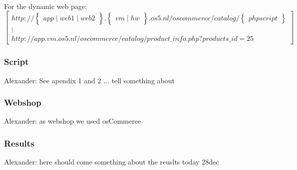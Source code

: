 \paragraph{}
For the dynamic web page:\\
$$ \begin{bmatrix}
http://  \begin{Bmatrix}app \mid web1 \mid web2 \end{Bmatrix} .  \begin{Bmatrix} vm \mid hw \end{Bmatrix} . os5 . nl /  oscommerce / catalog / \begin{Bmatrix} php script \end{Bmatrix}   \\ \vdots \\
http://  app .  vm . os5 . nl /  oscommerce / catalog / product\_info.php?products\_id=25   
\end{bmatrix}$$

\subsubsection{Script}
Alexander: See apendix 1 and 2 ... tell something about

\subsubsection{Webshop}
Alexander: as webshop we used osCommerce




\subsubsection{Results}
Alexander: here should come something about the reuslts today 28dec

